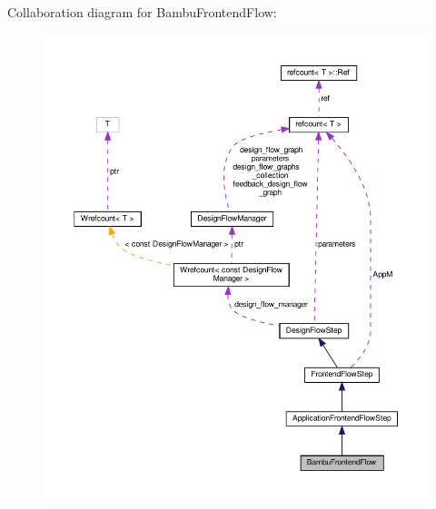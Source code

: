 Collaboration diagram for Bambu\+Frontend\+Flow\+:
\nopagebreak
\begin{figure}[H]
\begin{center}
\leavevmode
\includegraphics[width=350pt]{d5/d43/classBambuFrontendFlow__coll__graph}
\end{center}
\end{figure}
